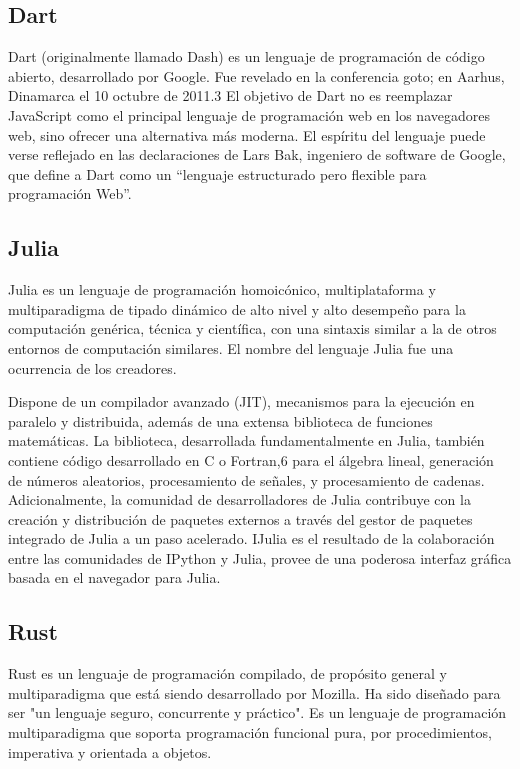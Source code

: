 \documentclass[twoside,twocolumn]{article}
\begin{document}
\subsection{Dart}

Dart (originalmente llamado Dash) es un lenguaje de programación de código abierto, desarrollado por Google. Fue revelado en la conferencia goto; en Aarhus, Dinamarca el 10 octubre de 2011.3​ El objetivo de Dart no es reemplazar JavaScript como el principal lenguaje de programación web en los navegadores web, sino ofrecer una alternativa más moderna. El espíritu del lenguaje puede verse reflejado en las declaraciones de Lars Bak, ingeniero de software de Google, que define a Dart como un “lenguaje estructurado pero flexible para programación Web”.

\subsection{Julia}

Julia es un lenguaje de programación homoicónico, multiplataforma y multiparadigma de tipado dinámico de alto nivel y alto desempeño para la computación genérica, técnica y científica, con una sintaxis similar a la de otros entornos de computación similares. El nombre del lenguaje Julia fue una ocurrencia de los creadores.

Dispone de un compilador avanzado (JIT), mecanismos para la ejecución en paralelo y distribuida, además de una extensa biblioteca de funciones matemáticas. La biblioteca, desarrollada fundamentalmente en Julia, también contiene código desarrollado en C o Fortran,6​ para el álgebra lineal, generación de números aleatorios, procesamiento de señales, y procesamiento de cadenas. Adicionalmente, la comunidad de desarrolladores de Julia contribuye con la creación y distribución de paquetes externos a través del gestor de paquetes integrado de Julia a un paso acelerado. IJulia es el resultado de la colaboración entre las comunidades de IPython y Julia, provee de una poderosa interfaz gráfica basada en el navegador para Julia. 

\subsection{Rust}

Rust es un lenguaje de programación compilado, de propósito general y multiparadigma que está siendo desarrollado por Mozilla.​ Ha sido diseñado para ser "un lenguaje seguro, concurrente y práctico".​ Es un lenguaje de programación multiparadigma que soporta programación funcional pura, por procedimientos, imperativa y orientada a objetos.
\end{document}
